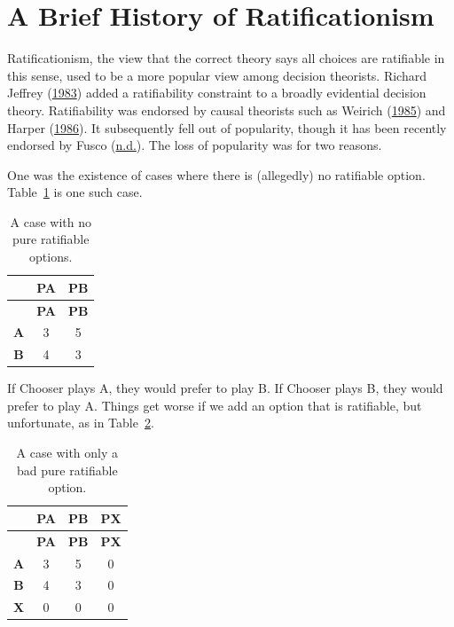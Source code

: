 \documentclass[
  12pt,
  letterpaper,
  DIV=11,
  numbers=noendperiod]{scrreprt}
\begin{document}
\hypertarget{a-brief-history-of-ratificationism}{%
\section{A Brief History of
Ratificationism}\label{a-brief-history-of-ratificationism}}

Ratificationism, the view that the correct theory says all choices are
ratifiable in this sense, used to be a more popular view among decision
theorists. Richard Jeffrey (\protect\hyperlink{ref-Jeffrey1983}{1983})
added a ratifiability constraint to a broadly evidential decision
theory. Ratifiability was endorsed by causal theorists such as Weirich
(\protect\hyperlink{ref-Weirich1985}{1985}) and Harper
(\protect\hyperlink{ref-Harper1986}{1986}). It subsequently fell out of
popularity, though it has been recently endorsed by Fusco
(\protect\hyperlink{ref-Fuscond}{n.d.}). The loss of popularity was for
two reasons.

One was the existence of cases where there is (allegedly) no ratifiable
option. Table~\ref{tbl-no-pure} is one such case.

\hypertarget{tbl-no-pure}{}
\begin{longtable}[]{@{}ccc@{}}
\caption{\label{tbl-no-pure}A case with no pure ratifiable
options.}\tabularnewline
\toprule\noalign{}
& \textbf{PA} & \textbf{PB} \\
\midrule\noalign{}
\endfirsthead
\toprule\noalign{}
& \textbf{PA} & \textbf{PB} \\
\midrule\noalign{}
\endhead
\bottomrule\noalign{}
\endlastfoot
\textbf{A} & 3 & 5 \\
\textbf{B} & 4 & 3 \\
\end{longtable}

If Chooser plays A, they would prefer to play B. If Chooser plays B,
they would prefer to play A. Things get worse if we add an option that
is ratifiable, but unfortunate, as in Table~\ref{tbl-bad-third}.

\hypertarget{tbl-bad-third}{}
\begin{longtable}[]{@{}cccc@{}}
\caption{\label{tbl-bad-third}A case with only a bad pure ratifiable
option.}\tabularnewline
\toprule\noalign{}
& \textbf{PA} & \textbf{PB} & \textbf{PX} \\
\midrule\noalign{}
\endfirsthead
\toprule\noalign{}
& \textbf{PA} & \textbf{PB} & \textbf{PX} \\
\midrule\noalign{}
\endhead
\bottomrule\noalign{}
\endlastfoot
\textbf{A} & 3 & 5 & 0 \\
\textbf{B} & 4 & 3 & 0 \\
\textbf{X} & 0 & 0 & 0 \\
\end{longtable}
\end{document}
